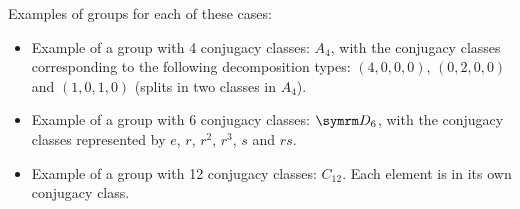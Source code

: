 \begin{solution}
Examples of groups for each of these cases:
\begin{itemize}
    \item Example of a group with 4 conjugacy classes: \(A_4\), with the conjugacy classes corresponding to the following decomposition types: \((4, 0, 0, 0)\), \((0, 2, 0, 0)\) and \((1, 0, 1, 0)\) (splits in two classes in \(A_4\)).
    
    \item Example of a group with 6 conjugacy classes: \(\dihedralgroup{6}\), with the conjugacy classes represented by \(e\), \(r\), \(r^2\), \(r^3\), \(s\) and \(r s\).
    
    \item Example of a group with 12 conjugacy classes: \(C_{12}\). Each element is in its own conjugacy class.
\end{itemize}
\end{solution}